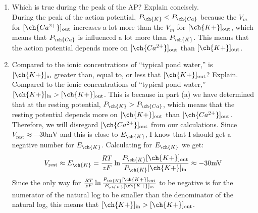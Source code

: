 \documentclass[11pt]{article}
\begin{document}
\begin{enumerate}[label=\arabic*.]
\begin{enumerate}[label=(\alph*)]
\item
Which is true during the peak of the AP? Explain concisely.
\vspace*{1\baselineskip}
\\
During the peak of the action potential, $P_{\ch{K}} < P_{\ch{Ca}}$ because the $V_m$ for $[\ch{Ca^{2+}}]_{\text{out}}$ increases a lot more than the $V_m$ for $[\ch{K+}]_{\text{out}}$, which means that $P_{\ch{Ca}}$ is influenced a lot more than $P_{\ch{K}}$. This means that the action potential depends more on $[\ch{Ca^{2+}}]_{\text{out}}$ than $[\ch{K+}]_{\text{out}}$.
\\



\item
Compared to the ionic concentrations of ``typical pond water,'' is $[\ch{K+}]_{\text{in}}$ greater than, equal to, or less that $[\ch{K+}]_{\text{out}}$? Explain.
\vspace*{1\baselineskip}
\\
Compared to the ionic concentrations of ``typical pond water,'' $[\ch{K+}]_{\text{in}} > [\ch{K+}]_{\text{out}}$. This is because in part (a) we have determined that at the resting potential, $P_{\ch{K}} > P_{\ch{Ca}}$, which means that the resting potential depends more on $[\ch{K+}]_{\text{out}}$ than $[\ch{Ca^{2+}}]_{\text{out}}$. Therefore, we will disregard $[\ch{Ca^{2+}}]_{\text{out}}$ from our calculations. Since $V_{\text{rest}} \approx -30 \text{mV}$ and this is close to $E_{\ch{K}}$, I know that I should get a negative number for $E_{\ch{K}}$. Calculating for $E_{\ch{K}}$ we get:
\begin{align*}
V_{\text{rest}} \approx E_{\ch{K}} = \frac{RT} {zF} \ln{\frac{P_{\ch{K}}[\ch{K+}]_{\text{out}}} {P_{\ch{K}}[\ch{K+}]_{\text{in}}}} \approx -30 \text{mV}
\end{align*}
Since the only way for $\frac{RT} {zF} \ln{\frac{P_{\ch{K}}[\ch{K+}]_{\text{out}}} {P_{\ch{K}}[\ch{K+}]_{\text{in}}}}$ to be negative is for the numerator of the natural log to be smaller than the denominator of the natural log, this means that $[\ch{K+}]_{\text{in}} > [\ch{K+}]_{\text{out}}$.
\\




\end{enumerate}
\end{enumerate}
\end{document}
